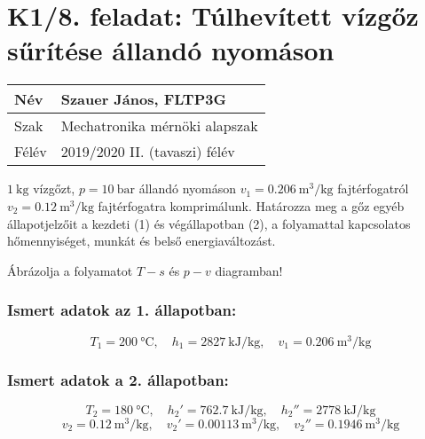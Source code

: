 \section*{K1/8. feladat: Túlhevített vízgőz sűrítése állandó nyomáson}
\begin{tabular}{ | p{2cm} | p{14cm} | } 
	\hline
	Név & Szauer János, FLTP3G \\ 
	\hline
	Szak & Mechatronika mérnöki alapszak \\ 
	\hline
	Félév & 2019/2020 II. (tavaszi) félév \\ 
	\hline
\end{tabular}
\vspace{1.5mm}

\noindent

$\SI{1}{\kilogram}$ vízgőzt, $p = \SI{10}{\bar}$ állandó nyomáson $v_1 = \SI{0,206}{\meter\cubed\per\kilogram}$ fajtérfogatról $v_2 = \SI{0,12}{\meter\cubed\per\kilogram}$ fajtérfogatra komprimálunk. Határozza meg a gőz egyéb állapotjelzőit a kezdeti (1) és végállapotban (2), a folyamattal kapcsolatos hőmennyiséget, munkát és belső energiaváltozást.

\vspace{2mm}

\noindent Ábrázolja a folyamatot $T-s$ és $p-v$ diagramban!

\subsubsection{Ismert adatok az 1. állapotban:}
\begin{equation*}
	T_1 = \SI{200}{\celsius},
	\quad
	h_1 = \SI{2827}{\kilo\joule\per\kilogram}, 
	\quad
	v_1 = \SI{0,206}{\meter\cubed\per\kilogram}
\end{equation*}

\subsubsection{Ismert adatok a 2. állapotban:}
\begin{equation*}
	T_2 = \SI{180}{\celsius},
	\quad
	h_2' = \SI{762,7}{\kilo\joule\per\kilogram},
	\quad
	h_2'' = \SI{2778}{\kilo\joule\per\kilogram}
\end{equation*}
\vspace{1.5mm}
\begin{equation*}
	v_2 = \SI{0,12}{\meter\cubed\per\kilogram},
	\quad
	v_2' = \SI{0,00113}{\meter\cubed\per\kilogram},
	\quad
	v_2'' = \SI{0,1946}{\meter\cubed\per\kilogram}
\end{equation*}

